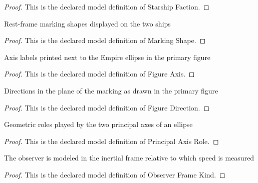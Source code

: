\begin{proof}
  This is the declared model definition of Starship Faction.
\end{proof}
\begin{definition}
  \label{def:physics:phyx-mini-0513:phyxminiproblems-problemphyxmini0513-markingshape}
  Rest-frame marking shapes displayed on the two ships
\end{definition}
\begin{proof}
  This is the declared model definition of Marking Shape.
\end{proof}
\begin{definition}
  \label{def:physics:phyx-mini-0513:phyxminiproblems-problemphyxmini0513-figureaxis}
  Axis labels printed next to the Empire ellipse in the primary figure
\end{definition}
\begin{proof}
  This is the declared model definition of Figure Axis.
\end{proof}
\begin{definition}
  \label{def:physics:phyx-mini-0513:phyxminiproblems-problemphyxmini0513-figuredirection}
  Directions in the plane of the marking as drawn in the primary figure
\end{definition}
\begin{proof}
  This is the declared model definition of Figure Direction.
\end{proof}
\begin{definition}
  \label{def:physics:phyx-mini-0513:phyxminiproblems-problemphyxmini0513-principalaxisrole}
  Geometric roles played by the two principal axes of an ellipse
\end{definition}
\begin{proof}
  This is the declared model definition of Principal Axis Role.
\end{proof}
\begin{definition}
  \label{def:physics:phyx-mini-0513:phyxminiproblems-problemphyxmini0513-observerframekind}
  The observer is modeled in the inertial frame relative to which speed is measured
\end{definition}
\begin{proof}
  This is the declared model definition of Observer Frame Kind.
\end{proof}
